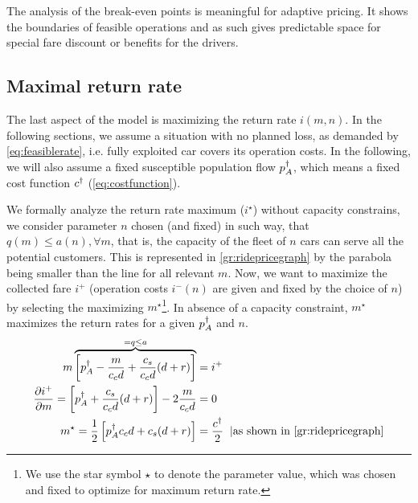 \documentclass[a4paper]{report}
\begin{document}
The analysis of the break-even points is meaningful for adaptive pricing. It shows the boundaries of feasible operations and as such gives predictable space for special fare discount or benefits for the drivers.

\newpage
\def\ms{m^{\star}}
\def\ns{n^\star}
\def\ccd{\frac{c_Mc_cd}{\tau}}
\subsection{Maximal return rate}
\label{ss:maxretrate}
The last aspect of the model is maximizing the return rate $i(m,n)$. In the following sections, we assume a situation with no planned loss, as demanded by \autoref{eq:feasiblerate}, i.e. fully exploited car covers its operation costs. In the following, we will also assume a fixed susceptible population flow $p_A^{\dagger}$, which means a fixed cost function $c^{\dagger}$ (\autoref{eq:costfunction}). %

We formally analyze the return rate maximum ($i^\star$) without capacity constrains, we consider parameter $n$ chosen (and fixed) in such way, that $q(m)\leq a(n), \forall m$, that is, the capacity of the fleet of $n$ cars can serve all the potential customers. This is represented in \autoref{gr:ridepricegraph} by the parabola being smaller than the line for all relevant $m$. Now, we want to maximize the collected fare $i^+$ (operation costs $i^-(n)$ are given and fixed by the choice of $n$) by selecting the maximizing $\ms$\protect\footnote{We use the star symbol $\star$ to denote the parameter value, which was chosen and fixed to optimize for maximum return rate.}.
In absence of a capacity constraint, $\ms$ maximizes the return rates for a given $p_A^{\dagger}$ and $n$.
\begin{align}
	m\overbrace{\left[\pd - \frac{m}{c_cd}+\frac{c_s}{c_cd}(d+r)\right]}^{=q\leq a}&=i^{+}\nonumber\\
	\frac{\partial i^{+}}{\partial m}=\left[\pd+\frac{c_s}{c_cd}(d+r)\right] - 2\frac{m}{c_cd}&=0\nonumber\\
	\ms=\frac{1}{2}\left[\pd c_cd+c_s(d+r)\right]&=\frac{\cd}{2}\;\;|\text{as shown in \autoref{gr:ridepricegraph}}\label{eq:maxreturngeneral}
\end{align}
\end{document}
